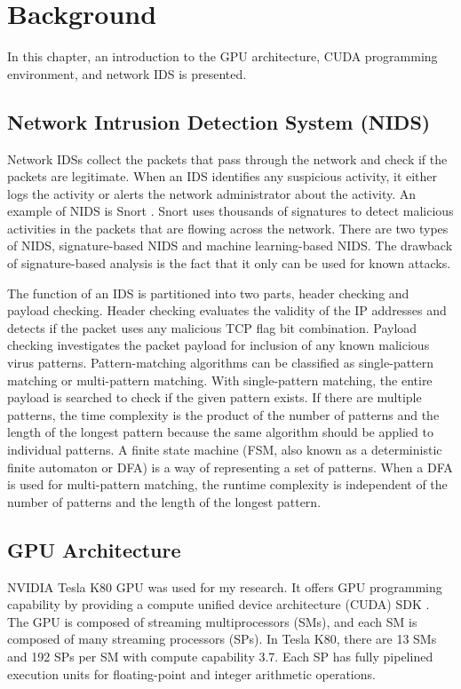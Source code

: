 \chapter{Background}

In this chapter, an introduction to the GPU architecture, CUDA programming environment, and network IDS is presented.

\section{Network Intrusion Detection System (NIDS)}
Network IDSs collect the packets that pass through the network and check if the packets are legitimate. When an IDS identifies any suspicious activity, it either logs the activity or alerts the network administrator about the activity. An example of NIDS is Snort \cite{bib11}. Snort uses thousands of signatures to detect malicious activities in the packets that are flowing across the network. There are two types of NIDS, signature-based NIDS and machine learning-based NIDS. The drawback of signature-based analysis is the fact that it only can be used for known attacks.

The function of an IDS is partitioned into two parts, header checking and payload checking. Header checking evaluates the validity of the IP addresses and detects if the packet uses any malicious TCP flag bit combination. Payload checking investigates the packet payload for inclusion of any known malicious virus patterns. Pattern-matching algorithms can be classified as single-pattern matching or multi-pattern matching. With single-pattern matching, the entire payload is searched to check if the given pattern exists. If there are multiple patterns, the time complexity is the product of the number of patterns and the length of the longest pattern because the same algorithm should be applied to individual patterns. A finite state machine (FSM, also known as a deterministic finite automaton or DFA) is a way of representing a set of patterns. When a DFA is used for multi-pattern matching, the runtime complexity is independent of the number of patterns and the length of the longest pattern.

\section{GPU Architecture}
NVIDIA Tesla K80 GPU was used for my research. It offers GPU programming capability by providing a compute unified device architecture (CUDA) SDK \cite{bib5}. The GPU is composed of streaming multiprocessors (SMs), and each SM is composed of many streaming processors (SPs). In Tesla K80, there are 13 SMs and 192 SPs per SM with compute capability 3.7. Each SP has fully pipelined execution units for floating-point and integer arithmetic operations.

